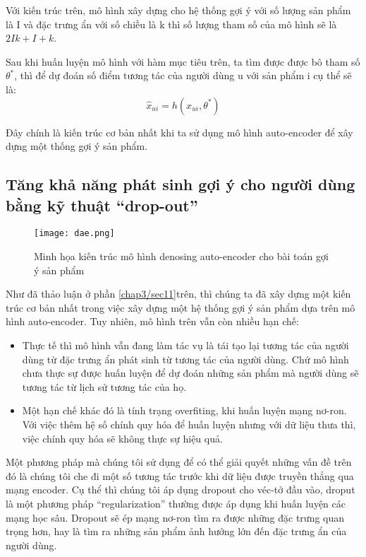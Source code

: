     Với kiến trúc trên, mô hình xây dựng cho hệ thống gợi ý với số lượng sản phẩm là I và đặc trưng ẩn với số chiều là k thì số lượng tham số của mô hình sẽ là $2Ik + I + k$.
    
    Sau khi huấn luyện mô hình với hàm mục tiêu trên, ta tìm được được bô tham số $\theta^*$, thì để dự đoán số điểm tương tác của người dùng u với sản phẩm i cụ thể sẽ là: 
    $$\widehat{x}_{ui} = h(x_{ui},\theta^*)$$

    Đây chính là kiến trúc cơ bản nhất khi ta sử dụng mô hình auto-encoder để xây dựng một thống gợi ý sản phẩm.
   


   



    \subsection{Tăng khả năng phát sinh gợi ý cho người dùng bằng kỹ thuật ``drop-out''}
    \begin{figure}
        \centering
        \texttt{[image: dae.png]}
        \caption{Minh họa kiến trúc mô hình denosing auto-encoder cho bài toán gợi ý sản phẩm}
        \label{fig_recdae}
    \end{figure}
    Như đã thảo luận ở phần \ref{chap3/sec11}trên, thì chúng ta đã xây dựng một kiến trúc cơ bản nhất trong việc xây dựng một hệ thống gợi ý sản phẩm dựa trên mô hình auto-encoder.
    Tuy nhiên, mô hình trên vẫn còn nhiều hạn chế: 
    \begin{itemize}
        \item Thực tế thì mô hình vẫn đang làm tác vụ là tái tạo lại tương tác của người dùng từ đặc trưng ẩn phát sinh từ tương tác của người dùng. Chứ mô hình chưa thực sự được huấn luyện để dự đoán những sản phẩm mà người dùng sẽ tương tác từ lịch sử tương tác của họ.
        \item Một hạn chế khác đó là tính trạng overfiting, khi huấn luyện mạng nơ-ron. Với việc thêm hệ số chính quy hóa để huấn luyện nhưng với dữ liệu thưa thì, việc chính quy hóa sẽ không thực sự hiệu quả.
    \end{itemize}
    
    Một phương pháp mà chúng tôi sử dụng để có thể giải quyết những vấn đề trên đó là chúng tôi che đi một số tương tác trước khi dữ liệu được truyền thẳng qua mạng encoder. 
    Cụ thể thì chúng tôi áp dụng dropout cho véc-tở đầu vào, droput là một phương pháp ``regularization'' thường được áp dụng khi huấn luyện các mạng học sâu. 
    Dropout sẽ ép mạng nơ-ron tìm ra được những đặc trưng quan trọng hơn, hay là tìm ra những sản phẩm ảnh hưởng lớn đến đặc trưng ẩn của người dùng. 
    
